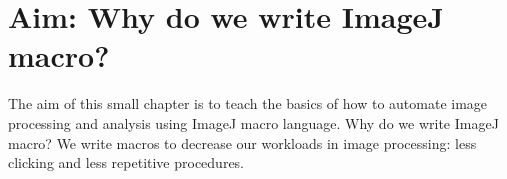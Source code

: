 \section{Aim: Why do we write ImageJ macro?}
  
The aim of this small chapter is to teach the basics of how to automate image processing and analysis using ImageJ macro language. Why do we write ImageJ macro? We write macros to decrease our workloads in image processing: less clicking and less repetitive procedures.